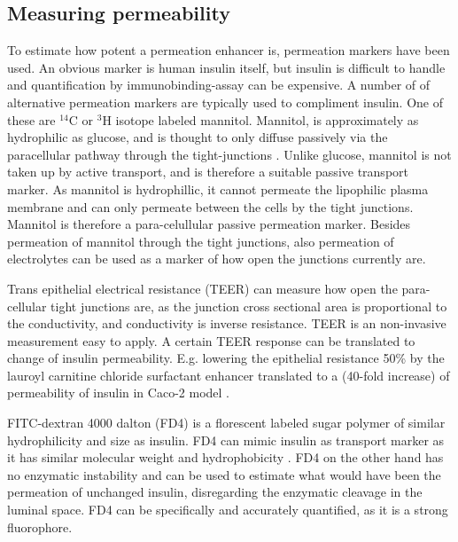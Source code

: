 \subsection{Measuring permeability}
To estimate how potent a permeation enhancer is, permeation markers have been used. An obvious marker is human insulin itself, but insulin is difficult to handle and quantification by immunobinding-assay can be expensive. A number of of alternative permeation markers are typically used to compliment insulin. One of these are $^{14}$C or $^3$H isotope labeled mannitol. Mannitol, is approximately as hydrophilic as glucose, and is thought to only diffuse passively via the paracellular pathway through the tight-junctions \cite{anderberg1992epithelial,artursson1994effect}. Unlike glucose, mannitol is not taken up by active transport, and is therefore a suitable passive transport marker. As mannitol is hydrophillic, it cannot permeate the lipophilic plasma membrane and can only permeate between the cells by the tight junctions. Mannitol is therefore a para-celullular passive permeation marker. Besides permeation of mannitol through the tight junctions, also permeation of electrolytes can be used as a marker of how open the junctions currently are.

Trans epithelial electrical resistance (TEER) can measure how open the para-cellular tight junctions are, as the junction cross sectional area is proportional to the conductivity, and conductivity is inverse resistance. TEER is an non-invasive measurement easy to apply. A certain TEER response can be translated to change of insulin permeability. E.g. lowering the epithelial resistance 50\% by the lauroyl carnitine chloride surfactant enhancer translated to a (40-fold increase) of permeability of insulin in Caco-2 model \cite{welling2014citric}.

FITC-dextran 4000 dalton (FD4) is a florescent labeled sugar polymer of similar hydrophilicity and size as insulin. FD4 can mimic insulin as transport marker as it has similar molecular weight and hydrophobicity \cite{vernon1999insulin}. FD4 on the other hand has no enzymatic instability and can be used to estimate what would have been the permeation of unchanged insulin, disregarding the enzymatic cleavage in the luminal space. FD4 can be specifically and accurately quantified, as it is a strong fluorophore.



